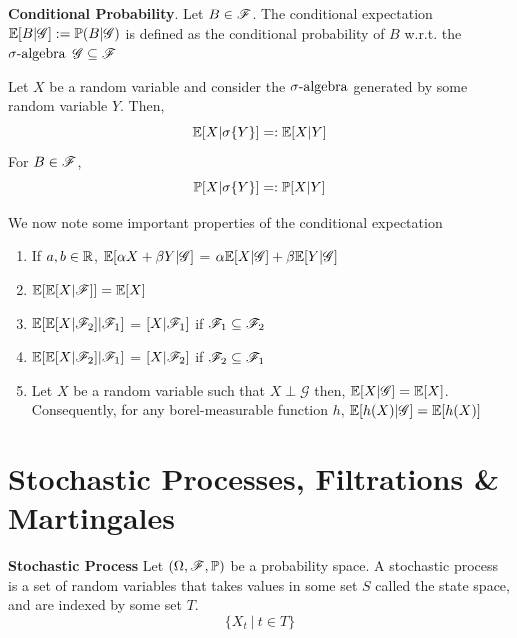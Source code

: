 \documentclass[../TGMAFFIRO.tex]{subfiles}
\begin{document}
\begin{definition}\textbf{Conditional Probability}.
	Let $B\in\mathscr{F}$. The conditional expectation $\mathbb{E}[B | \mathscr{G}] := \mathbb{P}(B | \mathscr{G})$ is defined as the conditional probability of $B$ w.r.t. the $\sigma\text{-algebra}$ $\mathscr{G} \subseteq \mathscr{F}$
\end{definition}


\begin{definition}
	Let $X$ be a random variable and consider the $\sigma\text{-algebra}$ generated by some random variable $Y$. Then,
	\begin{equation}
		\mathbb{E}[X | \sigma\{Y\}] =: \mathbb{E}[X | Y]
	\end{equation}
	For $B \in \mathscr{F}$,
	\begin{equation}
		\mathbb{P}[X | \sigma\{Y\}] =: \mathbb{P}[X | Y]
	\end{equation}
\end{definition}

\begin{proposition}
	We now note some important properties of the conditional expectation
	\begin{enumerate}
		\item If $a, b \in \mathbb{R}$, $\mathbb{E}[\alpha X + \beta Y | \mathscr{G}]$ = $\alpha \mathbb{E}[X | \mathscr{G}] + \beta\mathbb{E}[Y | \mathscr{G}]$
		\item $\mathbb{E}[\mathbb{E}[X | \mathscr{F}]] = \mathbb{E}[X]$
		\item $\mathbb{E}[\mathbb{E}[X | \mathscr{F}_2] | \mathscr{F}_1]$ = $[X | \mathscr{F}_1]$ if $\mathscr{F}_1 \subseteq \mathscr{F}_2$
		\item $\mathbb{E}[\mathbb{E}[X | \mathscr{F}_2] | \mathscr{F}_1]$ = $[X | \mathscr{F}_2]$ if $\mathscr{F}_2 \subseteq \mathscr{F}_1$
		\item Let $X$ be a random variable such that $X \perp \mathscr{G}$ then, $\mathbb{E}[X|\mathscr{G}] = \mathbb{E}[X]$. Consequently, for any borel-measurable function $h$, $\mathbb{E}[h(X)|\mathscr{G}] = \mathbb{E}[h(X)]$
	\end{enumerate}
\end{proposition}


\section{Stochastic Processes, Filtrations \& Martingales}

\begin{definition}\textbf{Stochastic Process}
	Let $(\Omega, \mathscr{F}, \mathbb{P})$ be a probability space. A stochastic process is a set of random variables that takes values in some set $S$ called the state space, and are indexed by some set $T$.
	\begin{equation}
		\{X_t \ | \ t \in T\}
	\end{equation}
\end{definition}
\end{document}

